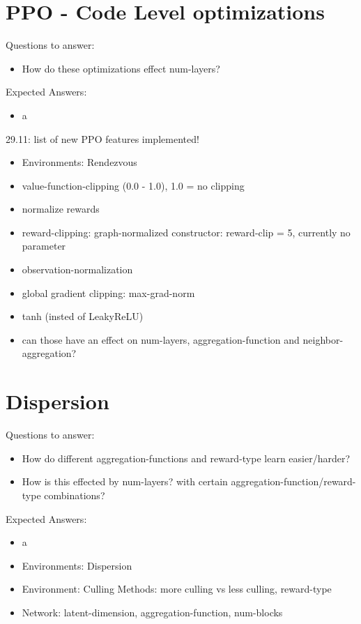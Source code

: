 \section{PPO - Code Level optimizations}
Questions to answer:
\begin{itemize}[noitemsep,nolistsep]
    \item How do these optimizations effect num-layers?
\end{itemize}
Expected Answers:
\begin{itemize}[noitemsep,nolistsep]
    \item a
\end{itemize}
29.11: list of new PPO features implemented!
\begin{itemize}[noitemsep,nolistsep]
    \item Environments: Rendezvous
    \item value-function-clipping (0.0 - 1.0), 1.0 = no clipping
    \item normalize rewards
    \item reward-clipping: graph-normalized constructor: reward-clip = 5, currently no parameter
    \item observation-normalization
    \item global gradient clipping: max-grad-norm
    \item tanh (insted of LeakyReLU)
    \item can those have an effect on num-layers, aggregation-function and neighbor-aggregation?
\end{itemize}


\section{Dispersion}
Questions to answer:
\begin{itemize}[noitemsep,nolistsep]
    \item How do different aggregation-functions and reward-type learn easier/harder?
    \item How is this effected by num-layers? with certain aggregation-function/reward-type combinations?
\end{itemize}
Expected Answers:
\begin{itemize}[noitemsep,nolistsep]
    \item a
\end{itemize}
\begin{itemize}[noitemsep,nolistsep]
    \item Environments: Dispersion
    \item Environment: Culling Methods: more culling vs less culling, reward-type
    \item Network: latent-dimension, aggregation-function, num-blocks
\end{itemize}
